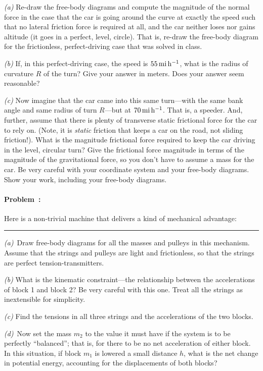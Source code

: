 \documentclass[12pt]{article}
\begin{document}
\textsl{(a)} Re-draw the free-body diagrams and compute the magnitude of
the normal force in the case that the car is going around the curve at
exactly the speed such that no lateral friction force is required at
all, and the car neither loses nor gains altitude (it goes in a
perfect, level, circle). That is, re-draw the free-body diagram for the
frictionless, perfect-driving case that was solved in class.

\textsl{(b)} If, in this perfect-driving case, the speed is $55\,\mathrm{mi}\,\mathrm{h}^{-1}$,
what is the radius of curvature $R$ of the turn? Give your answer in meters.
Does your answer seem reasonable?

\textsl{(c)} Now imagine that the car came into this same turn---with
the same bank angle and same radius of turn $R$---but at
$70\,\mathrm{mi}\,\mathrm{h}^{-1}$. That is, a speeder. And, further, assume that there is
plenty of transverse static frictional force for the car to rely on. (Note, it is
\emph{static} friction that keeps a car on the road, not sliding
friction!). What is the magnitude frictional force required to
keep the car driving in the level, circular turn?
Give the frictional force magnitude in terms of the magnitude of the gravitational force, so you don't have to assume a mass for the car.
Be very careful with your coordinate system and your free-body diagrams.
Show your work, including your free-body diagrams.

\paragraph{Problem~\theproblem:}%
Here is a non-trivial machine that delivers a kind of mechanical
advantage:
\\ \rule{0.33\textwidth}{0pt}

\textsl{(a)}~Draw free-body diagrams for all the masses and pulleys in
this mechanism. Assume that the strings and pulleys are light and
frictionless, so that the strings are perfect tension-transmitters.

\textsl{(b)} What is the kinematic constraint---the relationship
between the accelerations of block 1 and block 2? Be very careful with
this one. Treat all the strings as inextensible for simplicity.

\textsl{(c)} Find the tensions in all three strings and the
accelerations of the two blocks.

\textsl{(d)}~Now set the mass $m_2$ to the value it must have if the
system is to be perfectly ``balanced''; that is, for there to be no
net acceleration of either block.  In this situation, if block $m_1$
is lowered a small distance $h$, what is the net change in potential
energy, accounting for the displacements of both blocks?
\end{document}
